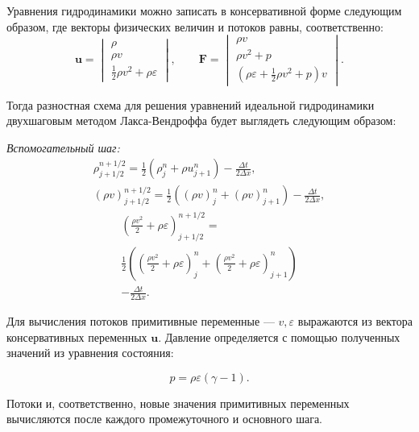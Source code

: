 \documentclass[a4paper]{article}
\begin{document}
	Уравнения гидродинамики можно записать в консервативной форме следующим образом,	
	где векторы физических величин и потоков равны, соответственно:
	\begin{equation}
	\mathbf{u}	=	\begin{vmatrix}
						\rho								\\
						\rho v								\\
						\frac{1}{2}\rho v^2 + \rho \varepsilon		
					\end{vmatrix} , \qquad	
	\mathbf{F}	=	\begin{vmatrix}
						\rho v								\\
						\rho v^2 + p								\\
						\left(\rho \varepsilon + \frac{1}{2}\rho v^2 + p\right)v	
	\end{vmatrix}	.		
	\end{equation}
	
	Тогда разностная схема для решения уравнений идеальной гидродинамики двухшаговым методом Лакса-Вендроффа будет выглядеть следующим образом:
	
	\textit{Вспомогательный шаг:}
	\begin{gather}\label{HydroHelper}
	\rho_{j+1/2}^{n+1/2} = \frac{1}{2} \left(\rho_{j}^{n} + \rho{u}_{j+1}^{n}\right)
		- \frac{\Delta t}{2 \Delta x}	,	\\
	(\rho v)_{j+1/2}^{n+1/2} = \frac{1}{2} \left((\rho v)_{j}^{n} + (\rho v)_{j+1}^{n}\right)
	- \frac{\Delta t}{2 \Delta x}		,						
	\end{gather}
	\begin{multline}
		\left(\frac{\rho v^2}{2} + \rho \varepsilon	\right)_{j+1/2}^{n+1/2} = \\
		\frac{1}{2} \left(\left(\frac{\rho v^2}{2} + \rho \varepsilon	\right)_{j}^{n} 
		+ \left(\frac{\rho v^2}{2} + \rho \varepsilon	\right)_{j+1}^{n}\right) \\
		- \frac{\Delta t}{2 \Delta x}	.
	\end{multline}
	
	Для вычисления потоков примитивные переменные --- $v, \varepsilon$ выражаются из вектора консервативных переменных $\mathbf{u}$. Давление определяется с помощью полученных значений из уравнения состояния:
	
	\begin{equation}
		p = \rho \varepsilon (\gamma -1).
	\end{equation}
	
	Потоки и, соответственно, новые значения примитивных переменных вычисляются после каждого промежуточного и основного шага.
	
\end{document}
